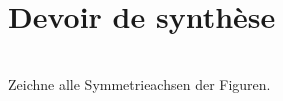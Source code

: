 \documentclass[10pt,openany]{book}
\begin{document}
\pagestyle{empty}
\section*{Devoir de synthèse}

\\
Zeichne alle Symmetrieachsen der Figuren.\\
[Contenu exercices...]
\end{document}
